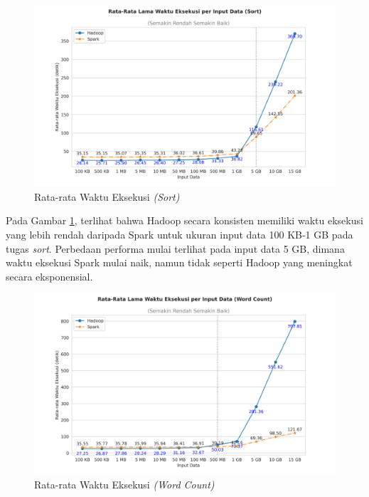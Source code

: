 \begin{figure}[h]
    \centering
    \includegraphics[width=1\textwidth]{figures/ch04/2-mean-lama-waktu-eksekusi-sort.png}
    \caption{Rata-rata Waktu Eksekusi \textit{(Sort)}}
    \label{fig:mean-dur-sort}
\end{figure}

Pada Gambar \ref{fig:mean-dur-sort}, terlihat bahwa Hadoop secara konsisten memiliki waktu eksekusi yang lebih rendah daripada Spark untuk ukuran input data 100 KB-1 GB pada tugas \textit{sort}. Perbedaan performa mulai terlihat pada input data 5 GB, dimana waktu eksekusi Spark mulai naik, namun tidak seperti Hadoop yang meningkat secara eksponensial.

\begin{figure}[h]
    \centering
    \includegraphics[width=1\textwidth]{figures/ch04/2-mean-lama-waktu-eksekusi-wordcount.png}
    \caption{Rata-rata Waktu Eksekusi \textit{(Word Count)}}
    \label{fig:mean-dur-wordcount}
\end{figure}

